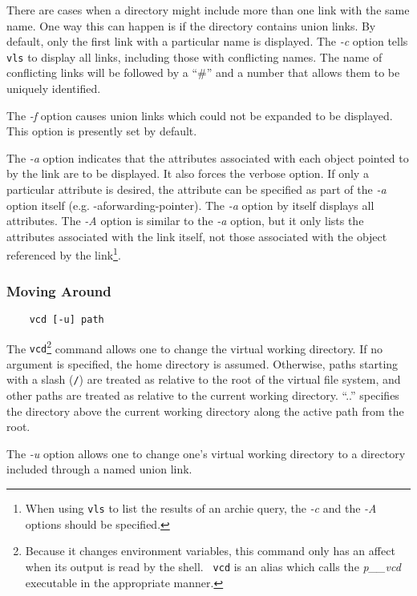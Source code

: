 There are cases when a directory might include more than one link with
the same name.  One way this can happen is if the directory contains
union links.  By default, only the first link with a particular name
is displayed.  The {\em -c} option tells {\tt vls} to display all
links, including those with conflicting names.  The name of
conflicting links will be followed by a ``\#'' and a number that
allows them to be uniquely identified.

The {\em -f} option causes union links which could not be expanded to
be displayed.  This option is presently set by default.

The {\em -a} option indicates that the attributes associated with each
object pointed to by the link are to be displayed.  It also forces the
verbose option.  If only a particular attribute is desired, the
attribute can be specified as 
part of the {\em -a} option itself (e.g. -a{\sc forwarding-pointer}).
The {\em -a} option by itself displays all attributes.  The {\em -A}
option is similar to the {\em -a} option, but it only lists the
attributes associated with the link itself, not those associated with
the object referenced by the link\footnote{When using {\tt vls} to
list the results of an archie query, the {\em -c} and the {\em -A}
options should be specified.}.

\subsubsection{Moving Around}

\begin{verbatim}
    vcd [-u] path
\end{verbatim}

The {\tt vcd}\footnote{Because it changes environment variables, this
command only has an affect when its output is read by the shell.  {\tt
vcd} is an alias which calls the {\it p\_\_vcd} executable in the
appropriate manner.} command allows one to change the virtual working
directory.  If no argument is specified, the home directory is
assumed.  Otherwise, paths starting with a slash ({\tt /}) are treated
as relative to the root of the virtual file system, and other paths
are treated as relative to the current working directory.  ``..''
specifies the directory above the current working directory along the
active path from the root.

The {\em -u} option allows one to change one's virtual working directory
to a directory included through a named union link.  

